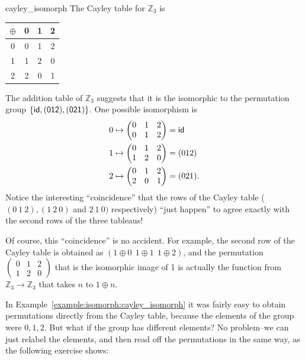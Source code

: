 \begin{example}{cayley_isomorph}
The Cayley table for ${\mathbb Z}_3$ is  
\begin{center}
\begin{tabular}{c|ccc}
$\oplus$   & 0 & 1 & 2 \\
\hline
0     & 0 & 1 & 2 \\
1     & 1 & 2 & 0 \\
2     & 2 & 0 & 1
\end{tabular}
\end{center}
The addition table of ${\mathbb Z}_3$ suggests that it is the isomorphic to the permutation group $ \{ \sf{id}, (0 1 2), (0 2 1) \}$.  One possible isomorphism  is 
\begin{align*}
0 & \mapsto
\begin{pmatrix}
0 & 1 & 2 \\
0 & 1 & 2
\end{pmatrix}
= \sf{id} \\
1 & \mapsto
\begin{pmatrix}
0 & 1 & 2 \\
1 & 2 & 0
\end{pmatrix}
= (0 1 2) \\
2 & \mapsto
\begin{pmatrix}
0 & 1 & 2 \\
2 & 0 & 1
\end{pmatrix}
= (0 2 1).
\end{align*}
Notice the interesting ``coincidence'' that  the rows of the Cayley table ( $(0~1~2), (1~2~0)$ and $2~1~0)$ respectively)  ``just happen'' to agree exactly with the second rows of the three tableaus! 

Of course, this ``coincidence'' is no accident.
For example, the second row of the Cayley table is obtained as $(1\oplus 0~~1\oplus 1~~1\oplus 2)$, and the permutation $\begin{pmatrix}
0 & 1 & 2 \\
1 & 2 & 0
\end{pmatrix}$ 
that is the isomorphic image of 1 is actually the function from ${\mathbb Z}_3 \rightarrow {\mathbb Z}_3$ that takes $n$ to $1 \oplus n$.   
\end{example}

In Example~\ref{example:isomorph:cayley_isomorph} it was fairly easy to obtain permutations directly from the Cayley table, because the elements of the group were $0,1,2$.  But what if the group has different elements? No problem--we can just relabel the elements, and then read off the permutations in the same way, as the following exercise shows:  


